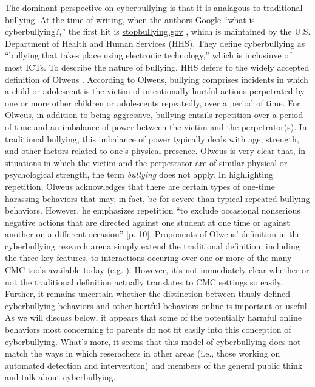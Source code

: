 \documentclass{sigchi}
\begin{document}
The dominant perspective on cyberbullying is that it is analagous to traditional bullying.  At the time of writing, when the authors Google ``what is cyberbullying?,'' the first hit is \href{https://www.stopbullying.gov/cyberbullying/what-is-it/index.html}{stopbullying.gov} \cite{u.s._department_of_health_and_human_services_what_2012}, which is maintained by the U.S. Department of Health and Human Services (HHS).  They define cyberbullying as ``bullying that takes place using electronic technology,'' which is inclusiuve of most ICTs.  To describe the nature of bullying, HHS defers to the widely accepted definition of Olweus \cite{Olweus1993Bullying}.  According to Olweus, bullying comprises incidents in which a child or adolescent is the victim of intentionally hurtful actions perpetrated by one or more other children or adolescents repeatedly, over a period of time.  For Olweus, in addition to being aggressive, bullying entails repetition over a period of time and an imbalance of power between the victim and the perpetrator(s).  In traditional bullying, this imbalance of power typically deals with age, strength, and other factors related to one's physical presence.  Olweus is very clear that, in situations in which the victim and the perpetrator are of similar physical or psychological strength, the term \textit{bullying} does not apply.  In highlighting repetition, Olweus acknowledges that there are certain types of one-time harassing behaviors that may, in fact, be for severe than typical repeated bullying behaviors.  However, he emphasizes repetition ``to exclude occasional nonserious negative actions that are directed against one student at one time or against another on a different occasion'' [p. 10].  Proponents of Olweus' definition in the cyberbullying research arena simply extend the traditional definition, including the three key features, to interactions occuring over one or more of the many CMC tools available today (e.g. \cite{Smith2008Cyberbullying}).  However, it's not immediately clear whether or not the traditional definition actually translates to CMC settings so easily.  Further, it remains uncertain whether the distinction between thusly defined cyberbullying behaviors and other hurtful behaviors online is important or useful.  As we will discuss below, it appears that some of the potentially harmful online behaviors most concerning to parents do not fit easily into this conception of cyberbullying.  What's more, it seems that this model of cyberbullying does not match the ways in which reserachers in other areas (i.e., those working on automated detection and intervention) and members of the general public think and talk about cyberbullying.
\end{document}
